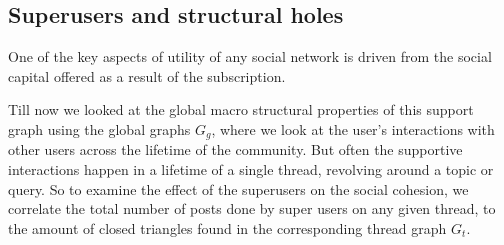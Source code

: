 \subsection{ Superusers and structural holes }
One of the key aspects of utility of any social network is driven from the social capital offered as a result of the subscription. 


Till now we looked at the global macro structural properties of this support graph using the global graphs $G_g$, where we look at the user's interactions with other users across the lifetime of the community. But often the supportive interactions happen in a lifetime of a single thread, revolving around a topic or query. So to examine the effect of the superusers on the social cohesion, we correlate the total number of posts done by super users on any given thread, to the amount of closed triangles found in the corresponding thread graph $G_t$.  

